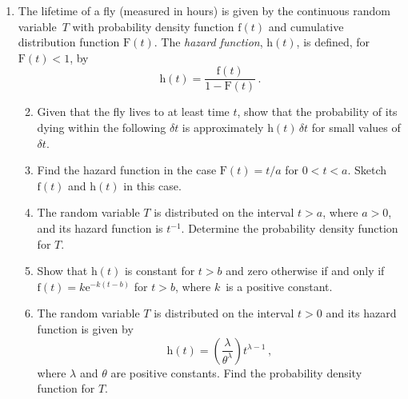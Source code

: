 \documentclass[a4, 11pt]{report}
\newlength{\qspace}
\newcounter{qnumber}
\newenvironment{question}%
 {\vspace{\qspace}
  \begin{enumerate}[\bfseries 1\quad][10]%
    \setcounter{enumi}{\value{qnumber}}%
    \item%
 }
{
  \end{enumerate}
  \filbreak
  \stepcounter{qnumber}
 }
\newenvironment{questionparts}[1][1]%
 {
  \begin{enumerate}[\bfseries (i)]%
    \setcounter{enumii}{#1}
    \addtocounter{enumii}{-1}
    \setlength{\itemsep}{5mm}
    \setlength{\parskip}{8pt}
 }
 {
  \end{enumerate}
 }
\renewcommand{\.}[1]{\ensuremath{\mathrm{#1}}}
\newcommand{\+}[1]{\ensuremath{\mathbf{#1}}}
\begin{document}
\begin{question}
  The lifetime of a fly (measured in hours) is given by the continuous
  random variable~$T$ with probability density function $\.f(t)$ and
  cumulative distribution function $\.F(t)$.  The \emph{hazard
    function}, $\.h(t)$, is defined, for $\.F(t)<1$, by
  \[
  \.h(t) = \frac{\.f(t)}{1-\.F(t)}\,.
  \]

  \begin{questionparts}
\item Given that the fly lives to at least  time $t$, show that the 
probability of its dying within the following $\delta t$ is 
approximately $\.h (t) \, \delta t$ for small values of $\delta t$. 


  \item Find the hazard function in the case $\.F(t) = t/a$ 
   for $0<    t <   a$. 
   Sketch $\.f(t)$ and $\.h(t)$ in this case.

  \item The random variable $T$ is distributed on the interval $t>  
    a$, where $a>0$, and its hazard function is $t^{-1}$.  Determine
    the probability density function for $T$.

  \item Show that $\.h(t)$ is constant for $t>b$          
    and zero otherwise if and only if $\.f(t) =k\.e^{-k(t-b)}$ for
    $t>b$,            where $k$~is a positive constant.

  \item The random variable $T$ is distributed on the interval $t>  0$
    and its hazard function is given by
    \[
    \.h(t) =
    \left(\frac{\lambda}{\theta^\lambda}\right)t^{\lambda-1}\,,
    \]
    where $\lambda$ and $\theta$ are positive constants.  Find the
    probability density function for $T$.
  \end{questionparts}
\end{question}
\end{document}
